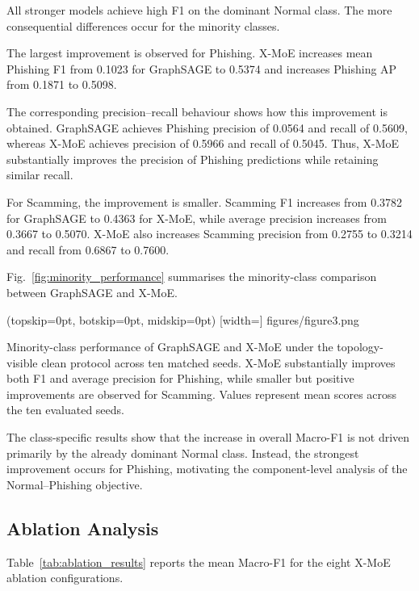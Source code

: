 \documentclass{ieeeaccess}
\begin{document}
All stronger models achieve high F1 on the dominant Normal class. The more consequential differences occur for the minority classes.

The largest improvement is observed for Phishing. X-MoE increases mean Phishing F1 from 0.1023 for GraphSAGE to 0.5374 and increases Phishing AP from 0.1871 to 0.5098.

The corresponding precision--recall behaviour shows how this improvement is obtained. GraphSAGE achieves Phishing precision of 0.0564 and recall of 0.5609, whereas X-MoE achieves precision of 0.5966 and recall of 0.5045. Thus, X-MoE substantially improves the precision of Phishing predictions while retaining similar recall.

For Scamming, the improvement is smaller. Scamming F1 increases from 0.3782 for GraphSAGE to 0.4363 for X-MoE, while average precision increases from 0.3667 to 0.5070. X-MoE also increases Scamming precision from 0.2755 to 0.3214 and recall from 0.6867 to 0.7600.

Fig.~\ref{fig:minority_performance} summarises the minority-class comparison between GraphSAGE and X-MoE.

\Figure[t!](topskip=0pt, botskip=0pt, midskip=0pt)
[width=\textwidth]
{figures/figure3.png}
{\parbox[t]{0.82\textwidth}{\raggedright
Minority-class performance of GraphSAGE and X-MoE under the topology-visible clean protocol across ten matched seeds. X-MoE substantially improves both F1 and average precision for Phishing, while smaller but positive improvements are observed for Scamming. Values represent mean scores across the ten evaluated seeds.}
\label{fig:minority_performance}}

The class-specific results show that the increase in overall Macro-F1 is not driven primarily by the already dominant Normal class. Instead, the strongest improvement occurs for Phishing, motivating the component-level analysis of the Normal--Phishing objective.


\subsection{Ablation Analysis}

Table~\ref{tab:ablation_results} reports the mean Macro-F1 for the eight X-MoE ablation configurations.
\end{document}
